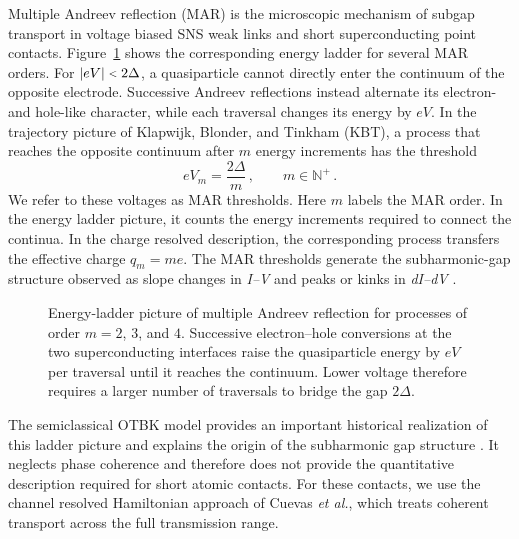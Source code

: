         Multiple Andreev reflection (MAR) is the microscopic mechanism of subgap transport in voltage biased SNS weak links and short superconducting point contacts. Figure~\ref{fig:meso:mar-schematic} shows the corresponding energy ladder for several MAR orders. For $|eV|\slt{}2\Delta$, a quasiparticle cannot directly enter the continuum of the opposite electrode. Successive Andreev reflections instead alternate its electron- and hole-like character, while each traversal changes its energy by $eV$. In the trajectory picture of Klapwijk, Blonder, and Tinkham (KBT), a process that reaches the opposite continuum after $m$ energy increments has the threshold
        \begin{equation}
            eV_m=\frac{2\Delta}{m}\,,\qquad m\in\mathbb{N}^+\,.
            \label{eq:meso:mar-sgs}
        \end{equation}
        We refer to these voltages as MAR thresholds. Here $m$ labels the MAR order. In the energy ladder picture, it counts the energy increments required to connect the continua. In the charge resolved description, the corresponding process transfers the effective charge $q_m=me$. The MAR thresholds generate the subharmonic-gap structure observed as slope changes in \textit{I--V} and peaks or kinks in \textit{dI--dV} \cite{klapwijk_explanation_1982,octavio_subharmonic_1983}.

        \begin{figure}[t]
            \centering
            \hfill
            \hfill
            \caption{
                Energy-ladder picture of multiple Andreev reflection for processes of order $m=2$, $3$, and $4$.
                Successive electron--hole conversions at the two superconducting interfaces raise the quasiparticle energy by $eV$ per traversal until it reaches the continuum.
                Lower voltage therefore requires a larger number of traversals to bridge the gap $2\Delta$.
                }
            \label{fig:meso:mar-schematic}
        \end{figure}

        The semiclassical OTBK model provides an important historical realization of this ladder picture and explains the origin of the subharmonic gap structure \cite{octavio_subharmonic_1983}. It neglects phase coherence and therefore does not provide the quantitative description required for short atomic contacts. For these contacts, we use the channel resolved Hamiltonian approach of Cuevas \textit{et al.}, which treats coherent transport across the full transmission range.


